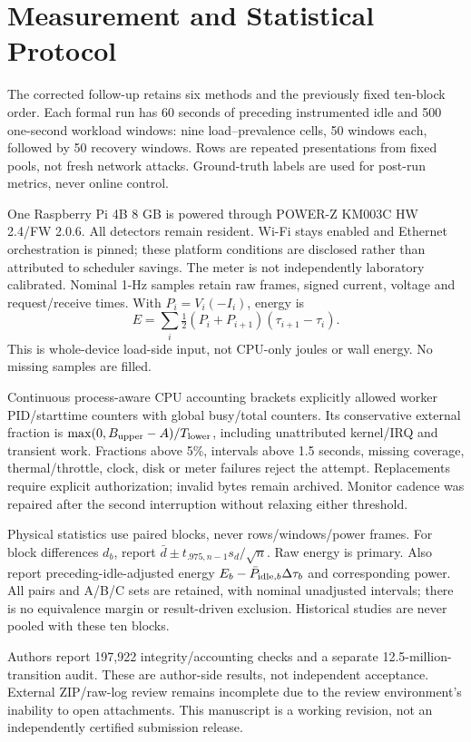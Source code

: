 \section{Measurement and Statistical Protocol}\label{sec:eval}
The corrected follow-up retains six methods and the previously fixed ten-block order. Each formal run has 60 seconds of preceding instrumented idle and 500 one-second workload windows: nine load--prevalence cells, 50 windows each, followed by 50 recovery windows. Rows are repeated presentations from fixed pools, not fresh network attacks. Ground-truth labels are used for post-run metrics, never online control.

One Raspberry Pi 4B 8 GB is powered through POWER-Z KM003C HW 2.4/FW 2.0.6. All detectors remain resident. Wi-Fi stays enabled and Ethernet orchestration is pinned; these platform conditions are disclosed rather than attributed to scheduler savings. The meter is not independently laboratory calibrated. Nominal 1-Hz samples retain raw frames, signed current, voltage and request/receive times. With $P_i=V_i(-I_i)$, energy is
\begin{equation}\label{eq:trap}
E=\sum_i\tfrac12(P_i+P_{i+1})(\tau_{i+1}-\tau_i).
\end{equation}
This is whole-device load-side input, not CPU-only joules or wall energy. No missing samples are filled.

Continuous process-aware CPU accounting brackets explicitly allowed worker PID/starttime counters with global busy/total counters. Its conservative external fraction is $\max(0,B_{\rm upper}-A)/T_{\rm lower}$, including unattributed kernel/IRQ and transient work. Fractions above 5\%, intervals above 1.5 seconds, missing coverage, thermal/throttle, clock, disk or meter failures reject the attempt. Replacements require explicit authorization; invalid bytes remain archived. Monitor cadence was repaired after the second interruption without relaxing either threshold.

Physical statistics use paired blocks, never rows/windows/power frames. For block differences $d_b$, report $\bar d\pm t_{.975,n-1}s_d/\sqrt n$. Raw energy is primary. Also report preceding-idle-adjusted energy $E_b-\bar P_{{\rm idle},b}\Delta\tau_b$ and corresponding power. All pairs and A/B/C sets are retained, with nominal unadjusted intervals; there is no equivalence margin or result-driven exclusion. Historical studies are never pooled with these ten blocks.

Authors report 197,922 integrity/accounting checks and a separate 12.5-million-transition audit. These are author-side results, not independent acceptance. External ZIP/raw-log review remains incomplete due to the review environment's inability to open attachments. This manuscript is a working revision, not an independently certified submission release.
